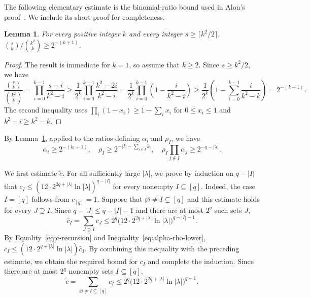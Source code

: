 \documentclass[12pt]{article}
\numberwithin{equation}{section}
\newtheorem{lemma}[theorem]{Lemma}
\theoremstyle{definition}
\begin{document}
 
The following elementary estimate is the binomial-ratio bound used in
Alon's proof~\cite{Alon2000}. We include its short proof for completeness.

\begin{lemma}\label{lem:half-binomial-ratio}
	For every positive integer $k$ and every integer
	$s\geq\lceil k^2/2\rceil$, $\binom{s}{k}/\binom{k^2}{k} \geq 2^{-(k+1)}$.
\end{lemma} 
\begin{proof}
	The result is immediate for $k=1$, so assume that $k\geq2$. Since $s\geq k^2/2$, we have
	\[ 
	\frac{\binom{s}{k}}{\binom{k^2}{k}} =  \prod_{i=0}^{k-1}\frac{s-i}{k^2-i} \geq \frac{1}{2^k}\prod_{i=0}^{k-1}\frac{k^2-2i}{k^2-i} =
	\frac{1}{2^k}\prod_{i=0}^{k-1}\left(1-\frac{i}{k^2-i}\right) \geq  \frac{1}{2^k}\left(1-\sum_{i=0}^{k-1}\frac{i}{k^2-k}\right)  =2^{-(k+1)}. 
	\]
	The second inequality uses $\prod_i(1-x_i)\geq1-\sum_i x_i$ for $0\leq x_i\leq1$ and
	$k^2-i\geq k^2-k$.
\end{proof} 

By Lemma~\ref{lem:half-binomial-ratio}, applied to the ratios defining
$\alpha_i$ and $\rho_I$, we have
\begin{equation}\label{eq:alpha-rho-lower}
 \alpha_i\geq2^{-(k_i+1)},
 \quad
 \rho_I\geq2^{-|I|-\sum_{i\in I}k_i},
 \quad
 \rho_I\prod_{j\notin I}\alpha_j\geq2^{-q-|\lambda|}.
\end{equation}

We first estimate $\widetilde c$. For all sufficiently large $|\lambda|$, we
prove by induction on $q-|I|$ that
$c_I\leq(12\cdot 2^{2q+|\lambda|}\ln|\lambda|)^{q-|I|}$ for every nonempty
$I\subseteq[q]$.
Indeed, the case $I=[q]$ follows from $c_{[q]}=1$. Suppose that
$\varnothing\ne I\subsetneq[q]$ and this estimate holds for every $J\supsetneq I$. Since
$q-|J|\leq q-|I|-1$ and there are at most $2^q$ such sets $J$,
\[
 \hat c_I=\sum_{J\supsetneq I}c_J
 \leq2^q
 \bigl(12\cdot 2^{2q+|\lambda|}\ln|\lambda|\bigr)^{q-|I|-1}.
\]
By Equality~\eqref{eq:c-recursion} and Inequality~\eqref{eq:alpha-rho-lower},
$c_I\leq(12\cdot 2^{q+|\lambda|}\ln|\lambda|)\hat c_I$. By combining this
inequality with the preceding estimate, we obtain the required bound for
$c_I$ and complete the induction. Since there are at most
$2^q$ nonempty sets $I\subseteq[q]$,
\begin{equation}\label{eq:ctilde-explicit-bound}
 \widetilde c
 =\sum_{\varnothing\ne I\subseteq[q]}c_I
 \leq2^q
 \bigl(12\cdot 2^{2q+|\lambda|}\ln|\lambda|\bigr)^{q-1}.
\end{equation}
\end{document}
